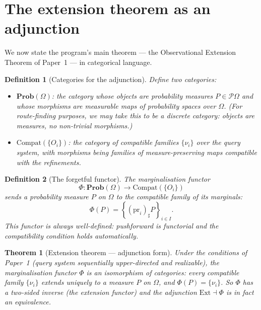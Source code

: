 \documentclass[11pt]{article}
\newtheorem{theorem}{Theorem}
\newtheorem{definition}{Definition}
\newcommand{\Prob}{\mathbf{Prob}}
\newcommand{\Pcal}{\mathcal{P}}
\newcommand{\pr}{\mathrm{pr}}
\begin{document}
\section{The extension theorem as an adjunction}
\label{sec:adjunction}

We now state the program's main theorem --- the Observational Extension
Theorem of Paper~1 --- in categorical language.

\begin{definition}[Categories for the adjunction]
Define two categories:
\begin{itemize}
  \item $\Prob(\Omega)$: the category whose objects are probability measures
    $P \in \Pcal\Omega$ and whose morphisms are measurable maps of probability
    spaces over $\Omega$.  (For route-finding purposes, we may take this to be
    a discrete category: objects are measures, no non-trivial morphisms.)
  \item $\mathrm{Compat}(\{O_i\})$: the category of compatible families
    $\{\nu_i\}$ over the query system, with morphisms being families of
    measure-preserving maps compatible with the refinements.
\end{itemize}
\end{definition}

\begin{definition}[The forgetful functor]
The \emph{marginalisation functor}
\[
  \Phi : \Prob(\Omega) \to \mathrm{Compat}(\{O_i\})
\]
sends a probability measure $P$ on $\Omega$ to the compatible family of its
marginals:
\[
  \Phi(P) = \left\{ (\pr_i)_\sharp P \right\}_{i \in I}.
\]
This functor is always well-defined: pushforward is functorial and the
compatibility condition holds automatically.
\end{definition}

\begin{theorem}[Extension theorem --- adjunction form]\label{thm:extension-adjunction}
Under the conditions of Paper~1 (query system sequentially upper-directed and
realizable), the marginalisation functor $\Phi$ is an \emph{isomorphism of
categories}: every compatible family $\{\nu_i\}$ extends uniquely to a measure
$P$ on $\Omega$, and $\Phi(P) = \{\nu_i\}$. So $\Phi$ has a two-sided inverse
(the extension functor) and the adjunction $\mathrm{Ext} \dashv \Phi$ is in fact
an equivalence.
\end{theorem}
\end{document}
